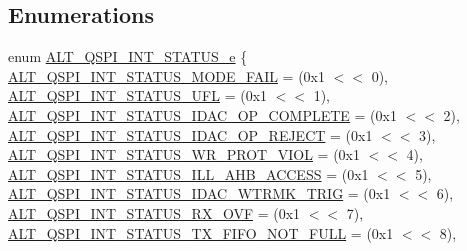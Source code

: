 \subsection*{Enumerations}
\begin{DoxyCompactItemize}
\item 
enum \mbox{\hyperlink{group__ALT__QSPI__CSR_ga919562dd181acc42914bea253e31fae1}{A\+L\+T\+\_\+\+Q\+S\+P\+I\+\_\+\+I\+N\+T\+\_\+\+S\+T\+A\+T\+U\+S\+\_\+e}} \{ \newline
\mbox{\hyperlink{group__ALT__QSPI__CSR_gga919562dd181acc42914bea253e31fae1afc999a0148242b4b2ad01f5f22ecda5b}{A\+L\+T\+\_\+\+Q\+S\+P\+I\+\_\+\+I\+N\+T\+\_\+\+S\+T\+A\+T\+U\+S\+\_\+\+M\+O\+D\+E\+\_\+\+F\+A\+IL}} = (0x1 $<$$<$ 0), 
\mbox{\hyperlink{group__ALT__QSPI__CSR_gga919562dd181acc42914bea253e31fae1aaf4c937a561295b3f46821b3a4daf134}{A\+L\+T\+\_\+\+Q\+S\+P\+I\+\_\+\+I\+N\+T\+\_\+\+S\+T\+A\+T\+U\+S\+\_\+\+U\+FL}} = (0x1 $<$$<$ 1), 
\mbox{\hyperlink{group__ALT__QSPI__CSR_gga919562dd181acc42914bea253e31fae1a2b3bca541ff4342b1067a65124c3af54}{A\+L\+T\+\_\+\+Q\+S\+P\+I\+\_\+\+I\+N\+T\+\_\+\+S\+T\+A\+T\+U\+S\+\_\+\+I\+D\+A\+C\+\_\+\+O\+P\+\_\+\+C\+O\+M\+P\+L\+E\+TE}} = (0x1 $<$$<$ 2), 
\mbox{\hyperlink{group__ALT__QSPI__CSR_gga919562dd181acc42914bea253e31fae1a856648b3c8f59893f2f181d9d1bba317}{A\+L\+T\+\_\+\+Q\+S\+P\+I\+\_\+\+I\+N\+T\+\_\+\+S\+T\+A\+T\+U\+S\+\_\+\+I\+D\+A\+C\+\_\+\+O\+P\+\_\+\+R\+E\+J\+E\+CT}} = (0x1 $<$$<$ 3), 
\newline
\mbox{\hyperlink{group__ALT__QSPI__CSR_gga919562dd181acc42914bea253e31fae1aabe3d2f8ae8e9fb9819478552a9d0032}{A\+L\+T\+\_\+\+Q\+S\+P\+I\+\_\+\+I\+N\+T\+\_\+\+S\+T\+A\+T\+U\+S\+\_\+\+W\+R\+\_\+\+P\+R\+O\+T\+\_\+\+V\+I\+OL}} = (0x1 $<$$<$ 4), 
\mbox{\hyperlink{group__ALT__QSPI__CSR_gga919562dd181acc42914bea253e31fae1a19e2215961ebdd2c445dc3154a504a75}{A\+L\+T\+\_\+\+Q\+S\+P\+I\+\_\+\+I\+N\+T\+\_\+\+S\+T\+A\+T\+U\+S\+\_\+\+I\+L\+L\+\_\+\+A\+H\+B\+\_\+\+A\+C\+C\+E\+SS}} = (0x1 $<$$<$ 5), 
\mbox{\hyperlink{group__ALT__QSPI__CSR_gga919562dd181acc42914bea253e31fae1a1dcba26836c5eb10e46f7744960abbcf}{A\+L\+T\+\_\+\+Q\+S\+P\+I\+\_\+\+I\+N\+T\+\_\+\+S\+T\+A\+T\+U\+S\+\_\+\+I\+D\+A\+C\+\_\+\+W\+T\+R\+M\+K\+\_\+\+T\+R\+IG}} = (0x1 $<$$<$ 6), 
\mbox{\hyperlink{group__ALT__QSPI__CSR_gga919562dd181acc42914bea253e31fae1a53b5fe67e8ba66e72d97c28a0526a323}{A\+L\+T\+\_\+\+Q\+S\+P\+I\+\_\+\+I\+N\+T\+\_\+\+S\+T\+A\+T\+U\+S\+\_\+\+R\+X\+\_\+\+O\+VF}} = (0x1 $<$$<$ 7), 
\newline
\mbox{\hyperlink{group__ALT__QSPI__CSR_gga919562dd181acc42914bea253e31fae1a3d41c8db75ea2e57603a2e7a56d6781a}{A\+L\+T\+\_\+\+Q\+S\+P\+I\+\_\+\+I\+N\+T\+\_\+\+S\+T\+A\+T\+U\+S\+\_\+\+T\+X\+\_\+\+F\+I\+F\+O\+\_\+\+N\+O\+T\+\_\+\+F\+U\+LL}} = (0x1 $<$$<$ 8), 
$$
\end{DoxyCompactItemize}
